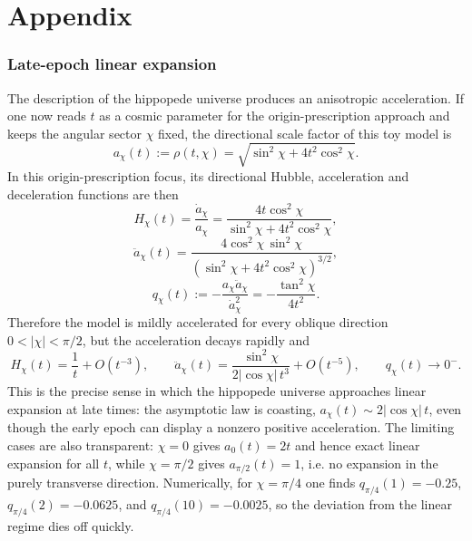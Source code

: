 \documentclass[3p,times,twocolumn]{elsarticle}
\begin{document}




\section*{Appendix}

\subsubsection*{Late-epoch linear expansion}

The description of the hippopede universe produces an anisotropic acceleration. If one now reads $t$ as a cosmic parameter for the origin-prescription approach and keeps the angular sector $\chi$ fixed, the directional scale factor of this toy model is
\begin{equation}
a_\chi(t):=\rho(t,\chi)=\sqrt{\sin^2\chi+4t^2\cos^2\chi}.
\end{equation}
In this origin-prescription focus, its directional Hubble, acceleration and deceleration functions are then
\begin{equation}
H_\chi(t)=\frac{\dot a_\chi}{a_\chi}=\frac{4t\cos^2\chi}{\sin^2\chi+4t^2\cos^2\chi},
\end{equation}
\begin{equation}
\ddot a_\chi(t)=\frac{4\cos^2\chi\,\sin^2\chi}{\left(\sin^2\chi+4t^2\cos^2\chi\right)^{3/2}},
\end{equation}
\begin{equation}
q_\chi(t):=-\frac{a_\chi\ddot a_\chi}{\dot a_\chi^2}=-\frac{\tan^2\chi}{4t^2}.
\end{equation}
Therefore the model is mildly accelerated for every oblique direction $0<|\chi|<\pi/2$, but the acceleration decays rapidly and
\begin{equation}
H_\chi(t)=\frac{1}{t}+O(t^{-3}),\qquad \ddot a_\chi(t)=\frac{\sin^2\chi}{2|{\cos\chi}|\,t^3}+O(t^{-5}),\qquad q_\chi(t)\to0^-.
\end{equation}
This is the precise sense in which the hippopede universe approaches linear expansion at late times: the asymptotic law is coasting, $a_\chi(t)\sim 2|{\cos\chi}|\,t$, even though the early epoch can display a nonzero positive acceleration. The limiting cases are also transparent: $\chi=0$ gives $a_0(t)=2t$ and hence exact linear expansion for all $t$, while $\chi=\pi/2$ gives $a_{\pi/2}(t)=1$, i.e. no expansion in the purely transverse direction. Numerically, for $\chi=\pi/4$ one finds $q_{\pi/4}(1)=-0.25$, $q_{\pi/4}(2)=-0.0625$, and $q_{\pi/4}(10)=-0.0025$, so the deviation from the linear regime dies off quickly.
\end{document}
